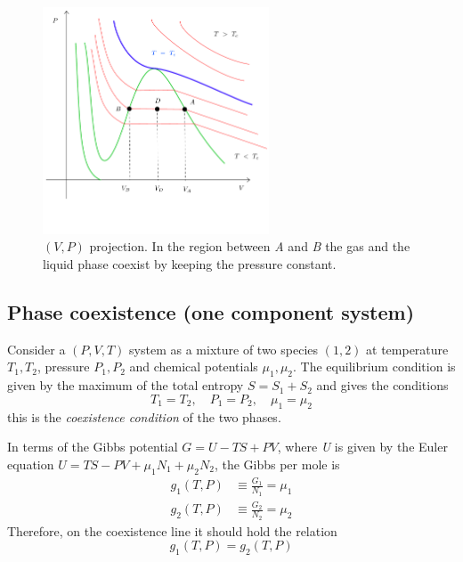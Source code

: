 \documentclass[../main/main.tex]{subfiles}
\begin{document}
  \begin{figure}[h!]
  \centering
  \includegraphics[width=0.6\textwidth]{../lessons/3_image/1.pdf}
  \caption{\label{fig:3_0} \( (V,P) \) projection. In the region between \emph{A} and \emph{B} the gas and the liquid phase coexist by keeping the pressure constant.}
  \end{figure}


\subsection{Phase coexistence (one component system)}

Consider a \( (P,V,T) \) system as a mixture of two species \( (1,2) \) at temperature \( T_1, T_2 \), pressure \( P_1, P_2 \) and chemical potentials \( \mu _1,\mu _2 \). The equilibrium condition is given by the maximum of the total entropy \( S = S_1 + S_2 \) and gives the conditions
\begin{equation}
  T_1 = T_2, \quad P_1 = P_2, \quad \mu _1 = \mu _2
  \label{eq:}
\end{equation}
this is the \emph{coexistence condition} of the two phases.

In terms of the Gibbs potential \( G = U- TS+PV \), where \emph{U} is given by  the Euler equation \( U = TS-PV+ \mu _1 N_1 + \mu _2 N_2 \), the Gibbs per mole is
\begin{subequations}
\begin{align}
  g_1 (T,P) &\equiv \frac{G_1}{N_1} = \mu _1 \\
  g_2 (T,P) &\equiv \frac{G_2}{N_2} = \mu _2
\end{align}
\label{}
\end{subequations}
Therefore, on the coexistence line it should hold the relation
\begin{equation}
  g_1 (T,P) = g_2 (T,P)
  \label{eq:}
\end{equation}
\end{document}
